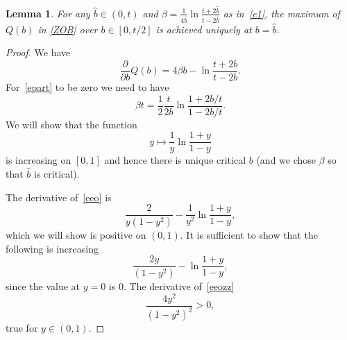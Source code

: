 \documentclass[10pt,a4paper]{amsart}
\newtheorem{lemma}{Lemma}
\begin{document}
\begin{lemma}\label{lem:maxb}
For any $\hat{b}\in (0,t)$ and $\beta=\frac{1}{4\hat{b}}\ln \frac{t + 2\hat{b}}{t - 2\hat{b}}$ as in~\eqref{e1}, the maximum of $Q(b)$ in \eqref{ZOB} over $b\in [0,t/2]$  is achieved uniquely at $b=\hat{b}$.
\end{lemma}

\begin{proof}
We have
\begin{equation}\label{epart}
\frac{\partial}{\partial b} Q(b) = 4\beta b - \ln\frac{t+2b}{t-2b}.
\end{equation}
For~\eqref{epart} to be zero we need to have
$$\beta t = \frac{1}{2} \frac{t}{2b} \ln\frac{1+2b/t}{1-2b/t}.$$
We will show that the function
\begin{equation}\label{eeo}
y\mapsto \frac{1}{y}\ln\frac{1+y}{1-y}
\end{equation}
is increasing on $[0,1]$ and hence there is unique critical $b$ (and we chose $\beta$ so that $\hat{b}$ is critical).

The derivative of~\eqref{eeo} is
$$
\frac{2}{y(1-y^2)} - \frac{1}{y^2}\ln\frac{1+y}{1-y},
$$
which we will show is positive on $(0,1)$. It is sufficient to show that the following is increasing
\begin{equation}\label{eeozz}
\frac{2y}{(1-y^2)} - \ln\frac{1+y}{1-y},
\end{equation}
since the value at $y=0$ is $0$. The derivative of~\eqref{eeozz} 
$$
\frac{4y^2}{(1-y^2)^2}>0,
$$
true for $y\in (0,1)$.
\end{proof}
\end{document}
